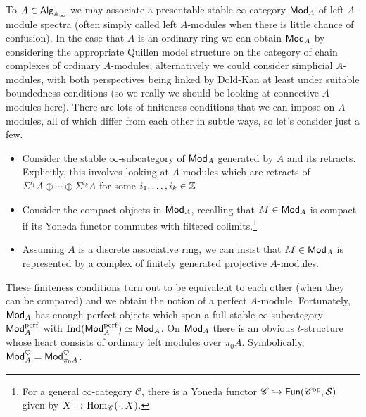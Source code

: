 \documentclass[11pt]{article}
\renewcommand{\C}{\mathscr{C}}
\renewcommand{\S}{\mathcal{S}}
\DeclareMathOperator{\perf}{perf} %
\begin{document}
To $A\in\operatorname{\mathsf{Alg}}_{\mathbb{A}_{\infty}}$ we may associate a presentable stable $\infty$-category $\operatorname{\mathsf{Mod}}_A$ of left $A$-module spectra (often simply called left $A$-modules when there is little chance of confusion). In the case that $A$ is an ordinary ring we can obtain $\operatorname{\mathsf{Mod}}_A$ by considering the appropriate Quillen model structure on the category of chain complexes of ordinary $A$-modules; alternatively we could consider simplicial $A$-modules, with both perspectives being linked by Dold-Kan at least under suitable boundedness conditions (so we really we should be looking at connective $A$-modules here). There are lots of finiteness conditions that we can impose on $A$-modules, all of which differ from each other in subtle ways, so let's consider just a few.
\begin{itemize}
\item Consider the stable $\infty$-subcategory of $\operatorname{\mathsf{Mod}}_A$ generated by $A$ and its retracts. Explicitly, this involves looking at $A$-modules which are retracts of $\Sigma^{i_1}A\oplus\cdots\oplus\Sigma^{i_k}A$ for some $i_1,\ldots,i_k\in\mathbb{Z}$

\item Consider the compact objects in $\operatorname{\mathsf{Mod}}_A$, recalling that $M\in\operatorname{\mathsf{Mod}}_A$ is compact if its Yoneda functor commutes with filtered colimits.\footnote{For a general $\infty$-category $\C$, there is a Yoneda functor $\C\inj\Fun(\C^{\op},\S)$ given by $X\mapsto\Hom_{\C}(\cdot,X)$.}

\item Assuming $A$ is a discrete associative ring, we can insist that $M\in\operatorname{\mathsf{Mod}}_A$ is represented by a complex of finitely generated projective $A$-modules.
\end{itemize}
These finiteness conditions turn out to be equivalent to each other (when they can be compared) and we obtain the notion of a perfect $A$-module. Fortunately, $\operatorname{\mathsf{Mod}}_A$ has enough perfect objects which span a full stable $\infty$-subcategory $\Mod_A^{\perf}$ with $\Ind(\Mod_A^{\perf})\simeq\Mod_A$. On $\operatorname{\mathsf{Mod}}_A$ there is an obvious $t$-structure whose heart consists of ordinary left modules over $\pi_0A$. Symbolically, $\operatorname{\mathsf{Mod}}_A^{\heartsuit}=\operatorname{\mathsf{Mod}}_{\pi_0A}^{\heartsuit}$.
\end{document}
